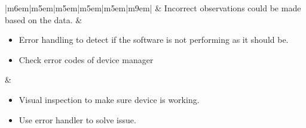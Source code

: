 \documentclass{article}
\begin{document}
\begin{table}[H]
\begin{tabular}{|m{6em}|m{5em}|m{5em}|m{5em}|m{5em}|m{9em}|}
			 & Incorrect observations could be made based on the data.
			 & \begin{minipage}[t]{\linewidth}
				   \begin{itemize}[nosep, wide=0pt, leftmargin=*, after=\strut]
					\item Error handling to detect if the software is not performing as it should be.
					\item Check error codes of device manager
				\end{itemize}
			   \end{minipage}
	
			 & \begin{minipage}[t]{\linewidth}
				   \begin{itemize}[nosep, wide=0pt, leftmargin=*, after=\strut]
					\item Visual inspection to make sure device is working.
					\item Use error handler to solve issue.
				\end{itemize}
			   \end{minipage}  \tabularnewline{}
		\end{tabular}%
	\caption{\label{tab:DataView}Data View System FMEA  \\\hspace{0.1\textwidth} \textbf{Req:} \hyperref[SR1]{SR1},\hyperref[SR2]{SR2}}
	\end{table}
	
\end{document}
